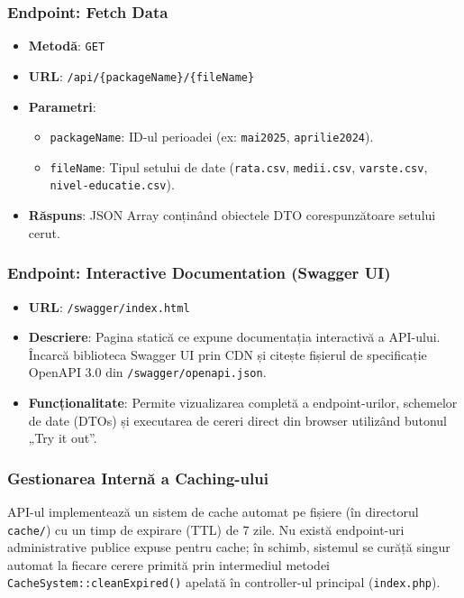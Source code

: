 \documentclass[12pt,a4paper]{article}
\begin{document}
\subsubsection{Endpoint: Fetch Data}
\begin{itemize}
    \item \textbf{Metodă}: \texttt{GET}
    \item \textbf{URL}: \texttt{/api/\{packageName\}/\{fileName\}}
    \item \textbf{Parametri}:
        \begin{itemize}
            \item \texttt{packageName}: ID-ul perioadei (ex: \texttt{mai2025}, \texttt{aprilie2024}).
            \item \texttt{fileName}: Tipul setului de date (\texttt{rata.csv}, \texttt{medii.csv}, \texttt{varste.csv}, \texttt{nivel-educatie.csv}).
        \end{itemize}
    \item \textbf{Răspuns}: JSON Array conținând obiectele DTO corespunzătoare setului cerut.
\end{itemize}

\subsubsection{Endpoint: Interactive Documentation (Swagger UI)}
\begin{itemize}
    \item \textbf{URL}: \texttt{/swagger/index.html}
    \item \textbf{Descriere}: Pagina statică ce expune documentația interactivă a API-ului. Încarcă biblioteca Swagger UI prin CDN și citește fișierul de specificație OpenAPI 3.0 din \texttt{/swagger/openapi.json}.
    \item \textbf{Funcționalitate}: Permite vizualizarea completă a endpoint-urilor, schemelor de date (DTOs) și executarea de cereri direct din browser utilizând butonul „Try it out”.
\end{itemize}

\subsubsection{Gestionarea Internă a Caching-ului}
API-ul implementează un sistem de cache automat pe fișiere (în directorul \texttt{cache/}) cu un timp de expirare (TTL) de 7 zile. Nu există endpoint-uri administrative publice expuse pentru cache; în schimb, sistemul se curăță singur automat la fiecare cerere primită prin intermediul metodei \texttt{CacheSystem::cleanExpired()} apelată în controller-ul principal (\texttt{index.php}).
\end{document}
